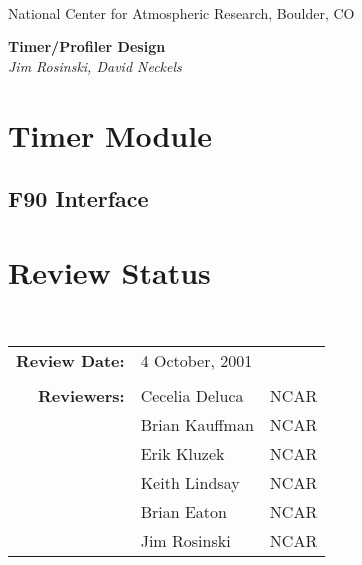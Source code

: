 \documentclass[]{article}
\begin{document}

\begin{titlepage}

\begin{latexonly}
 \\
\noindent National Center for Atmospheric Research, Boulder, CO \\
\vspace{2in}
\end{latexonly}

\begin{center}
{\Large\bf Timer/Profiler Design} \\
\medskip
{\it Jim Rosinski, David Neckels}
\end{center}

\end{titlepage}

\tableofcontents

\newpage


\section{Timer Module}



\subsection{F90 Interface}






\section{Review Status}

 \\

\begin{tabular}{r p{1.3in} p{2in}} 
{\bf Review Date:} & 4 October, 2001     \\ \\   
{\bf Reviewers:}   & Cecelia Deluca     & NCAR \\ 
                   & Brian Kauffman     & NCAR \\ 
                   & Erik Kluzek        & NCAR \\ 
                   & Keith Lindsay      & NCAR \\ 
                   & Brian Eaton        & NCAR \\ 
                   & Jim Rosinski       & NCAR
\end{tabular}
\end{document}

